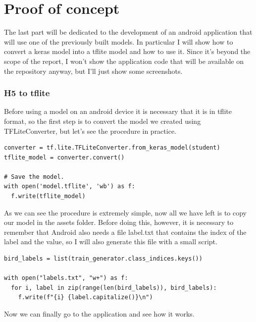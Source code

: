 \section{Proof of concept}
The last part will be dedicated to the development of an android application that will use one of the previously built models. In particular I will show how to convert a keras model into a tflite model and how to use it. Since it's beyond the scope of the report, I won't show the application code that will be available on the repository anyway, but I'll just show some screenshots.\\
\subsubsection{H5 to tflite}
Before using a model on an android device it is necessary that it is in tflite format, so the first step is to convert the model we created using TFLiteConverter, but let's see the procedure in practice.

\lstset{language=Python}
\lstset{frame=lines}
\lstset{basicstyle=\footnotesize}
\begin{lstlisting}
converter = tf.lite.TFLiteConverter.from_keras_model(student)
tflite_model = converter.convert()

# Save the model.
with open('model.tflite', 'wb') as f:
  f.write(tflite_model)
\end{lstlisting}

As we can see the procedure is extremely simple, now all we have left is to copy our model in the assets folder. Before doing this, however, it is necessary to remember that Android also needs a file label.txt that contains the index of the label and the value, so I will also generate this file with a small script.

\lstset{language=Python}
\lstset{frame=lines}
\lstset{basicstyle=\footnotesize}
\begin{lstlisting}
bird_labels = list(train_generator.class_indices.keys())

with open("labels.txt", "w+") as f:
  for i, label in zip(range(len(bird_labels)), bird_labels):
    f.write(f"{i} {label.capitalize()}\n")
\end{lstlisting}

Now we can finally go to the application and see how it works.

